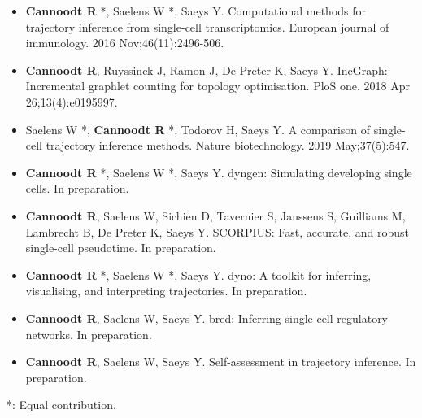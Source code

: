 \begin{itemize}
  \item \textbf{Cannoodt R} *, Saelens W *, Saeys Y. Computational methods for trajectory inference from single-cell transcriptomics. European journal of immunology. 2016 Nov;46(11):2496-506.
  \item \textbf{Cannoodt R}, Ruyssinck J, Ramon J, De Preter K, Saeys Y. IncGraph: Incremental graphlet counting for topology optimisation. PloS one. 2018 Apr 26;13(4):e0195997.
  \item Saelens W *, \textbf{Cannoodt R} *, Todorov H, Saeys Y. A comparison of single-cell trajectory inference methods. Nature biotechnology. 2019 May;37(5):547.
  \item \textbf{Cannoodt R} *, Saelens W *, Saeys Y. dyngen: Simulating developing single cells. In preparation.
  \item \textbf{Cannoodt R}, Saelens W, Sichien D, Tavernier S, Janssens S, Guilliams M, Lambrecht B, De Preter K, Saeys Y. SCORPIUS: Fast, accurate, and robust single-cell pseudotime. In preparation.
  \item \textbf{Cannoodt R} *, Saelens W *, Saeys Y. dyno: A toolkit for inferring, visualising, and interpreting trajectories. In preparation.
  \item \textbf{Cannoodt R}, Saelens W, Saeys Y. bred: Inferring single cell regulatory networks. In preparation.
  \item \textbf{Cannoodt R}, Saelens W, Saeys Y. Self-assessment in trajectory inference. In preparation.
 \end{itemize}

*: Equal contribution.

